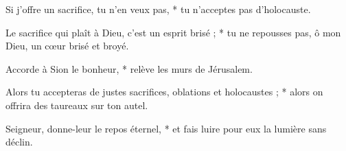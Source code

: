 \item Si j'offre un sacrifice, tu n'en veux pas, * tu n'acceptes pas d'holocauste.

\item Le sacrifice qui plaît à Dieu, c'est un esprit brisé ; * tu ne repousses pas, ô mon Dieu, un cœur brisé et broyé.

\item Accorde à Sion le bonheur, * relève les murs de Jérusalem.

\item Alors tu accepteras de justes sacrifices, oblations et holocaustes ; * alors on offrira des taureaux sur ton autel.

\item Seigneur, donne-leur le repos éternel, * et fais luire pour eux la lumière sans déclin.